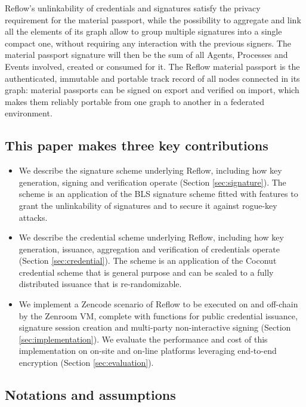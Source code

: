 \documentclass[twocolumn]{article}
\begin{document}
Reflow's unlinkability of credentials and signatures satisfy the privacy
requirement for the material passport, while the possibility to
aggregate and link all the elements of its graph allow to group multiple
signatures into a single compact one, without requiring any interaction
with the previous signers. The material passport signature will then be
the sum of all Agents, Processes and Events involved, created or
consumed for it. The Reflow material passport is the authenticated,
immutable and portable track record of all nodes connected in its graph:
material passports can be signed on export and verified on import, which
makes them reliably portable from one graph to another in a federated
environment.

\subsection*{This paper makes three key contributions}

\begin{itemize}
\item We describe the signature scheme underlying Reflow, including how
  key generation, signing and verification operate (Section
  \ref{sec:signature}). The scheme is an application of the BLS signature scheme
  \citep{asiacrypt-bls} fitted with features to grant the unlinkability of
  signatures and to secure it against rogue-key attacks.
\item We describe the credential scheme underlying Reflow, including how
  key generation, issuance, aggregation and verification of credentials operate
  (Section \ref{sec:credential}). The scheme is an application of the Coconut
  credential scheme \citep{coconut-2018} that is general purpose and can be
  scaled to a fully distributed issuance that is re-randomizable.
\item We implement a Zencode scenario of Reflow to be executed on and
  off-chain by the Zenroom VM, complete with functions for public credential
  issuance, signature session creation and multi-party non-interactive signing
  (Section \ref{sec:implementation}). We evaluate the performance and cost of
  this implementation on on-site and on-line platforms leveraging end-to-end
  encryption (Section \ref{sec:evaluation}).
\end{itemize}

\subsection*{Notations and assumptions}
\end{document}
